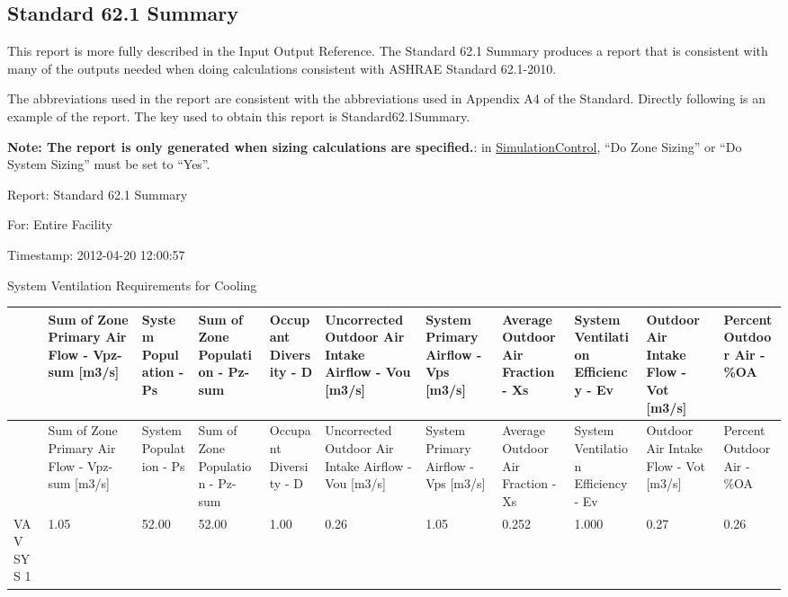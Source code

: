 \subsection{Standard 62.1 Summary}\label{standard-62.1-summary}

This report is more fully described in the Input Output Reference. The Standard 62.1 Summary produces a report that is consistent with many of the outputs needed when doing calculations consistent with ASHRAE Standard 62.1-2010.

The abbreviations used in the report are consistent with the abbreviations used in Appendix A4 of the Standard. Directly following is an example of the report. The key used to obtain this report is Standard62.1Summary.

\textbf{Note: The report is only generated when sizing calculations are specified.}: in \hyperref[simulationcontrol]{SimulationControl}, ``Do Zone Sizing'' or ``Do System Sizing'' must be set to ``Yes''.

Report: Standard 62.1 Summary

For: Entire Facility

Timestamp: 2012-04-20 12:00:57

System Ventilation Requirements for Cooling

{\scriptsize
\begin{longtable}[c]{>{\raggedright}p{0.54in}>{\raggedright}p{0.54in}>{\raggedright}p{0.54in}>{\raggedright}p{0.54in}>{\raggedright}p{0.54in}>{\raggedright}p{0.54in}>{\raggedright}p{0.54in}>{\raggedright}p{0.54in}>{\raggedright}p{0.54in}>{\raggedright}p{0.54in}>{\raggedright}p{0.54in}}
\toprule
 & Sum of Zone Primary Air Flow - Vpz-sum [m3/s] & System Population - Ps & Sum of Zone Population - Pz-sum & Occupant Diversity - D & Uncorrected Outdoor Air Intake Airflow - Vou [m3/s] & System Primary Airflow - Vps [m3/s] & Average Outdoor Air Fraction - Xs & System Ventilation Efficiency - Ev & Outdoor Air Intake Flow - Vot [m3/s] & Percent Outdoor Air - \%OA \tabularnewline
\midrule
\endfirsthead

\toprule
 & Sum of Zone Primary Air Flow - Vpz-sum [m3/s] & System Population - Ps & Sum of Zone Population - Pz-sum & Occupant Diversity - D & Uncorrected Outdoor Air Intake Airflow - Vou [m3/s] & System Primary Airflow - Vps [m3/s] & Average Outdoor Air Fraction - Xs & System Ventilation Efficiency - Ev & Outdoor Air Intake Flow - Vot [m3/s] & Percent Outdoor Air - \%OA \tabularnewline
\midrule
\endhead

VAV SYS 1 & 1.05 & 52.00 & 52.00 & 1.00 & 0.26 & 1.05 & 0.252 & 1.000 & 0.27 & 0.26 \tabularnewline
\bottomrule
\end{longtable}}

